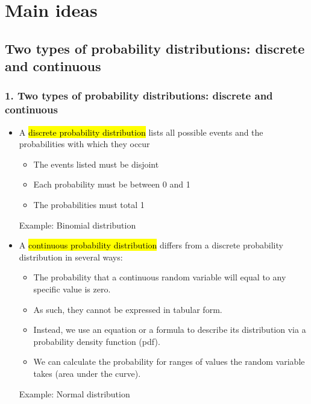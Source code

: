 \documentclass[slidestop,compress,mathserif,12pt,t,professionalfonts,xcolor=table]{beamer}
\begin{document}

\section{Main ideas}


\subsection{Two types of probability distributions: discrete and continuous}
\label{mi1}


\begin{frame}
\frametitle{1. Two types of probability distributions: discrete and continuous}

\begin{itemize}

\item A \hl{discrete probability distribution} lists all possible events and the probabilities with 
which they occur
\begin{itemize}
\item The events listed must be disjoint
\item Each probability must be between 0 and 1 
\item The probabilities must total 1
\end{itemize}
Example: Binomial distribution

\pause

\item A \hl{continuous probability distribution} differs from a discrete probability distribution in 
several ways:
\begin{itemize}
\item The probability that a continuous random variable will equal to any specific value is zero.
\item As such, they cannot be expressed in tabular form.
\item Instead, we use an equation or a formula to describe its distribution via a probability density 
function (pdf).
\item We can calculate the probability for ranges of values the random variable takes (area under 
the curve).
\end{itemize}
Example: Normal distribution

\end{itemize}

\end{frame}
\end{document}
